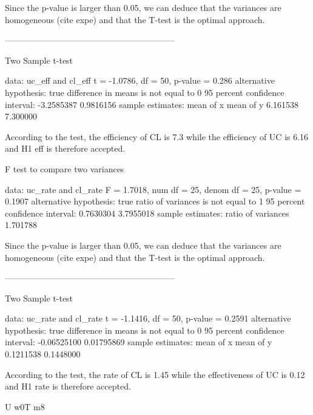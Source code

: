 \documentclass[10pt,twocolumn]{article}
\begin{document}
Since the p-value is larger than 0.05, we can deduce that the variances are homogeneous (cite expe) and that the T-test is the optimal approach.

------------------------------------------------------------

	Two Sample t-test

data:  uc_eff and cl_eff
t = -1.0786, df = 50, p-value = 0.286
alternative hypothesis: true difference in means is not equal to 0
95 percent confidence interval:
 -3.2585387  0.9816156
sample estimates:
mean of x mean of y 
 6.161538  7.300000 


According to the test, the efficiency of CL is 7.3 while the efficiency of UC is 6.16 and H1 eff is therefore accepted. 


	F test to compare two variances

data:  uc_rate and cl_rate
F = 1.7018, num df = 25, denom df = 25, p-value = 0.1907
alternative hypothesis: true ratio of variances is not equal to 1
95 percent confidence interval:
 0.7630304 3.7955018
sample estimates:
ratio of variances 
          1.701788 

Since the p-value is larger than 0.05, we can deduce that the variances are homogeneous (cite expe) and that the T-test is the optimal approach.

------------------------------------------------------------

	Two Sample t-test

data:  uc_rate and cl_rate
t = -1.1416, df = 50, p-value = 0.2591
alternative hypothesis: true difference in means is not equal to 0
95 percent confidence interval:
 -0.06525100  0.01795869
sample estimates:
mean of x mean of y 
0.1211538 0.1448000 

According to the test, the rate of CL is 1.45 while the effectiveness of UC is 0.12 and H1 rate is therefore accepted. 







U w0T m8
\end{document}
